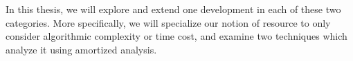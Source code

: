 \documentclass[draft]{westhesis}
\begin{document}
In this thesis, we will explore and extend one development in each of these two categories. More specifically, we will specialize our notion of resource to only consider algorithmic complexity or time cost, and examine two techniques which analyze it using amortized analysis.





 



\end{document}
